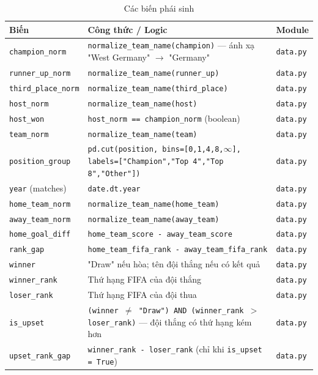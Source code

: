 \documentclass[12pt,a4paper]{article}
\begin{document}
\begin{table}[H]
\centering
\caption{Các biến phái sinh}
\label{tab:derived_fields}
\begin{tabular}{lp{8cm}l}
\toprule
\textbf{Biến} & \textbf{Công thức / Logic} & \textbf{Module} \\
\midrule
\texttt{champion\_norm} & \texttt{normalize\_team\_name(champion)} --- ánh xạ "West Germany" $\rightarrow$ "Germany" & \texttt{data.py} \\
\texttt{runner\_up\_norm} & \texttt{normalize\_team\_name(runner\_up)} & \texttt{data.py} \\
\texttt{third\_place\_norm} & \texttt{normalize\_team\_name(third\_place)} & \texttt{data.py} \\
\texttt{host\_norm} & \texttt{normalize\_team\_name(host)} & \texttt{data.py} \\
\texttt{host\_won} & \texttt{host\_norm == champion\_norm} (boolean) & \texttt{data.py} \\
\texttt{team\_norm} & \texttt{normalize\_team\_name(team)} & \texttt{data.py} \\
\texttt{position\_group} & \texttt{pd.cut(position, bins=[0,1,4,8,$\infty$], labels=["Champion","Top 4","Top 8","Other"])} & \texttt{data.py} \\
\texttt{year} (matches) & \texttt{date.dt.year} & \texttt{data.py} \\
\texttt{home\_team\_norm} & \texttt{normalize\_team\_name(home\_team)} & \texttt{data.py} \\
\texttt{away\_team\_norm} & \texttt{normalize\_team\_name(away\_team)} & \texttt{data.py} \\
\texttt{home\_goal\_diff} & \texttt{home\_team\_score - away\_team\_score} & \texttt{data.py} \\
\texttt{rank\_gap} & \texttt{home\_team\_fifa\_rank - away\_team\_fifa\_rank} & \texttt{data.py} \\
\texttt{winner} & "Draw" nếu hòa; tên đội thắng nếu có kết quả & \texttt{data.py} \\
\texttt{winner\_rank} & Thứ hạng FIFA của đội thắng & \texttt{data.py} \\
\texttt{loser\_rank} & Thứ hạng FIFA của đội thua & \texttt{data.py} \\
\texttt{is\_upset} & \texttt{(winner $\neq$ "Draw") AND (winner\_rank $>$ loser\_rank)} --- đội thắng có thứ hạng kém hơn & \texttt{data.py} \\
\texttt{upset\_rank\_gap} & \texttt{winner\_rank - loser\_rank} (chỉ khi \texttt{is\_upset = True}) & \texttt{data.py} \\

\end{tabular}
\end{table}
\end{document}
